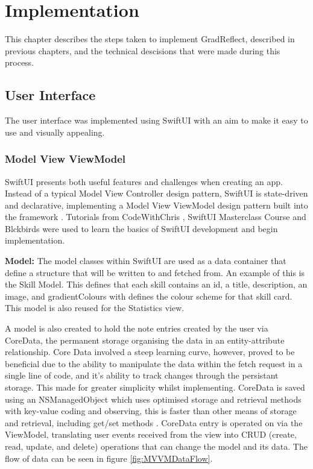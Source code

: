 \documentclass{l4proj}
\begin{document}
\chapter{Implementation} \label{implementation}

This chapter describes the steps taken to implement GradReflect, described in previous chapters, and the technical descisions that were made during this process.

\section{User Interface}

The user interface was implemented using SwiftUI with an aim to make it easy to use and visually appealing. 

\subsection{Model View ViewModel}

SwiftUI presents both useful features and challenges when creating an app. Instead of a typical Model View Controller design pattern, SwiftUI is state-driven and declarative, implementing a Model View ViewModel design pattern built into the framework \citep{naumov_swiftui_architecture_2019}. Tutorials from CodeWithChris \citep{ching_codewithchris_2021}, SwiftUI Masterclass Course \citep{petras_swiftui_2021} and Blckbirds \citep{blckbirds_learn_2021} were used to learn the basics of SwiftUI development and begin implementation.

\textbf{Model:} The model classes within SwiftUI are used as a data container that define a structure that will be written to and fetched from. An example of this is the Skill Model. This defines that each skill contains an id, a title, description, an image, and gradientColours with defines the colour scheme for that skill card. This model is also reused for the Statistics view.

A model is also created to hold the note entries created by the user via CoreData, the permanent storage organising the data in an entity-attribute relationship. Core Data involved a steep learning curve, however, proved to be beneficial due to the ability to manipulate the data within the fetch request in a single line of code, and it's ability to track changes through the persistant storage. This made for greater simplicity whilst implementing. CoreData is saved using an NSManagedObject which uses optimised storage and retrieval methods with key-value coding and observing, this is faster than other means of storage and retrieval, including get/set methods \citep{apple_developer_documentation_core_2021}. CoreData entry is operated on via the ViewModel, translating user events received from the view into CRUD (create, read, update, and delete) operations that can change the model and its data. The flow of data can be seen in figure \ref{fig:MVVMDataFlow}. 
\end{document}
